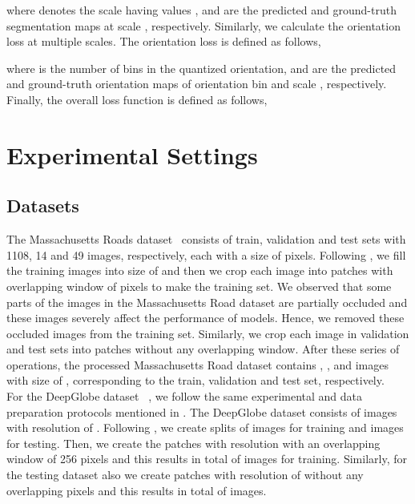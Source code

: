 \documentclass[letterpaper, 10 pt, conference]{ieeeconf}
\begin{document}
where  denotes the scale having values ,  and  are the predicted and ground-truth segmentation maps at scale , respectively. Similarly, we calculate the orientation loss at multiple scales. The orientation loss  is defined as follows,

where  is the number of bins in the quantized orientation,  and   are the predicted and ground-truth orientation maps of orientation bin  and scale , respectively. Finally, the overall loss  function  is defined as follows,

\section{Experimental Settings}
\subsection{Datasets}
 The Massachusetts Roads dataset~\cite{mnih2013machine} consists of train, validation and test sets with 1108, 14 and 49 images, respectively, each with a size of  pixels. Following \cite{wulamu2019multiscale}, we fill the training images into size of  and then we crop each image into  patches with overlapping window of  pixels to make the training set. We observed that some parts of the images in the Massachusetts Road dataset are partially occluded and these images severely affect the performance of models. Hence, we removed these occluded images from the training set. Similarly, we crop each image in validation and test sets into  patches without any overlapping window. After these series of operations, the processed Massachusetts Road dataset contains , , and  images with size of , corresponding to the train, validation and test set, respectively.\\
 For the DeepGlobe dataset ~\cite{demir2018deepglobe}, we follow the same experimental and data preparation protocols mentioned in \cite{batra2019improved}. The DeepGlobe dataset consists  of  images with resolution of . Following \cite{batra2019improved}, we create splits of  images for training and  images for testing. Then, we create the patches with  resolution with an overlapping window of 256 pixels and this results in total of  images for training. Similarly, for the testing dataset also we create patches with resolution of  without any overlapping pixels and this results in total of  images.\\
\end{document}

